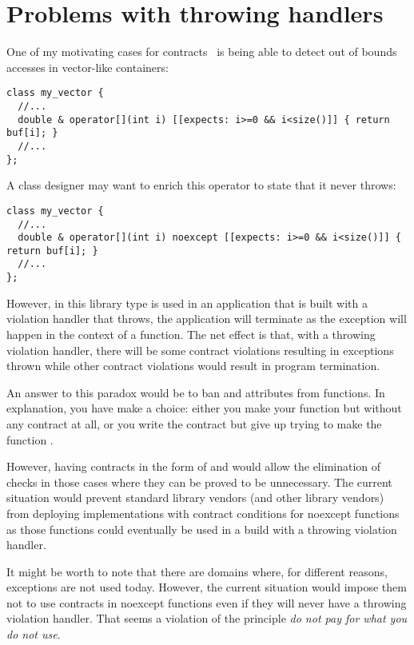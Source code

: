 \section{Problems with throwing handlers}

One of my motivating cases for contracts~\cite{p0542} is being able to detect out of bounds
accesses in vector-like containers:

\begin{lstlisting}
class my_vector {
  //...
  double & operator[](int i) [[expects: i>=0 && i<size()]] { return buf[i]; }
  //...
};
\end{lstlisting}

A class designer may want to enrich this operator to state that it never throws:

\begin{lstlisting}
class my_vector {
  //...
  double & operator[](int i) noexcept [[expects: i>=0 && i<size()]] { return buf[i]; }
  //...
};
\end{lstlisting}

However, in this library type is used in an application that is built with a
violation handler that throws, the application will terminate as the exception
will happen in the context of a  function. The net effect is
that, with a throwing violation handler, there will be some contract violations
resulting in exceptions thrown while other contract violations would result in
program termination.

An answer to this paradox would be to ban  and 
attributes from  functions. In explanation, you have make a
choice: either you make your function  but without any contract
at all, or you write the contract but give up trying to make the function
.

However, having contracts in the form of  and 
would allow the elimination of checks in those cases where they can be proved to
be unnecessary. The current situation would prevent standard library vendors
(and other library vendors) from deploying implementations with contract
conditions for noexcept functions as those functions could eventually be used in
a build with a throwing violation handler.

It might be worth to note that there are domains where, for different reasons,
exceptions are not used today. However, the current situation would impose them
not to use contracts in noexcept functions even if they will never have a
throwing violation handler. That seems a violation of the principle \emph{do not
pay for what you do not use}.
